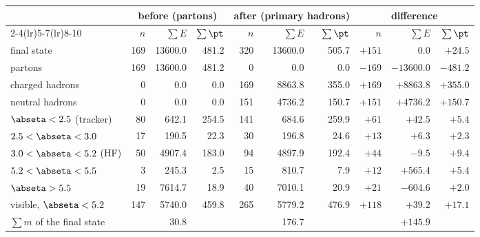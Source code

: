 \begin{center}\begin{minipage}{\textwidth}\centering\footnotesize
{}
\label{tab:05ledger}
\begin{tabular}{lrrrrrrrrr}
\toprule
 & \multicolumn{3}{c}{before (partons)} & \multicolumn{3}{c}{after (primary hadrons)} & \multicolumn{3}{c}{difference} \\
\cmidrule(lr){2-4}\cmidrule(lr){5-7}\cmidrule(lr){8-10}
 & $n$ & $\sum E$ & $\sum\pt$ & $n$ & $\sum E$ & $\sum\pt$ & $n$ & $\sum E$ & $\sum\pt$ \\
\midrule
final state & 169 & 13600.0 & 481.2 & 320 & 13600.0 & 505.7 & $+151$ & $0.0$ & $+24.5$ \\
\quad partons & 169 & 13600.0 & 481.2 & 0 & 0.0 & 0.0 & $-169$ & $-13600.0$ & $-481.2$ \\
\quad charged hadrons & 0 & 0.0 & 0.0 & 169 & 8863.8 & 355.0 & $+169$ & $+8863.8$ & $+355.0$ \\
\quad neutral hadrons & 0 & 0.0 & 0.0 & 151 & 4736.2 & 150.7 & $+151$ & $+4736.2$ & $+150.7$ \\
\midrule
$\abseta<2.5$ (tracker) & 80 & 642.1 & 254.5 & 141 & 684.6 & 259.9 & $+61$ & $+42.5$ & $+5.4$ \\
$2.5<\abseta<3.0$ & 17 & 190.5 & 22.3 & 30 & 196.8 & 24.6 & $+13$ & $+6.3$ & $+2.3$ \\
$3.0<\abseta<5.2$ (HF) & 50 & 4907.4 & 183.0 & 94 & 4897.9 & 192.4 & $+44$ & $-9.5$ & $+9.4$ \\
$5.2<\abseta<5.5$ & 3 & 245.3 & 2.5 & 15 & 810.7 & 7.9 & $+12$ & $+565.4$ & $+5.4$ \\
$\abseta>5.5$ & 19 & 7614.7 & 18.9 & 40 & 7010.1 & 20.9 & $+21$ & $-604.6$ & $+2.0$ \\
visible, $\abseta<5.2$ & 147 & 5740.0 & 459.8 & 265 & 5779.2 & 476.9 & $+118$ & $+39.2$ & $+17.1$ \\
\midrule
$\sum m$ of the final state & & 30.8 & & & 176.7 & & & $+145.9$ & \\

\end{tabular}
\end{minipage}
\end{center}

